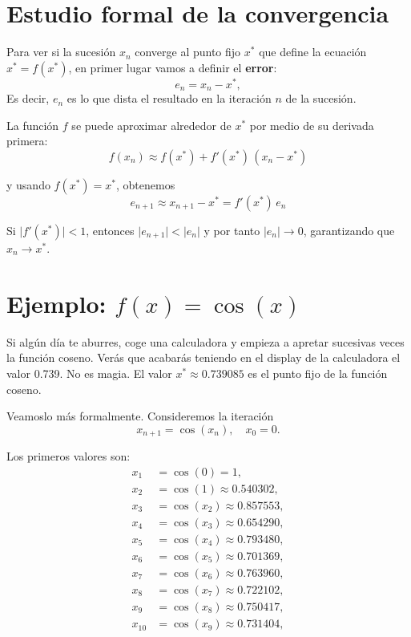 \documentclass[
  11pt,
  a4paper,
  DIV=11,
  numbers=noendperiod]{scrreprt}
\begin{document}
\section{Estudio formal de la
convergencia}\label{estudio-formal-de-la-convergencia}

Para ver si la sucesión \(x_n\) converge al punto fijo \(x^*\) que
define la ecuación \(x^* = f(x^*)\), en primer lugar vamos a definir el
\textbf{error}: \[
e_n = x_n - x^*,
\] Es decir, \(e_n\) es lo que dista el resultado en la iteración \(n\)
de la sucesión.

La función \(f\) se puede aproximar alrededor de \(x^*\) por medio de su
derivada primera: \[
f(x_n) \approx f(x^*) + f'(x^*)\,(x_n - x^*) 
\]

y usando \(f(x^*)=x^*\), obtenemos \[
e_{n+1} \approx x_{n+1} - x^* = f'(x^*)\,e_n 
\]

Si \(\lvert f'(x^*)\rvert < 1\), entonces
\(\lvert e_{n+1}\rvert < \lvert e_n\rvert\) y por tanto
\(\lvert e_n\rvert\to0\), garantizando que \(x_n\to x^*\).

\section{\texorpdfstring{Ejemplo:
\(f(x)=\cos(x)\)}{Ejemplo: f(x)=\textbackslash cos(x)}}\label{ejemplo-fxcosx}

Si algún día te aburres, coge una calculadora y empieza a apretar
sucesivas veces la función coseno. Verás que acabarás teniendo en el
display de la calculadora el valor 0.739. No es magia. El valor
\(x^* \approx 0.739085\) es el punto fijo de la función coseno.

Veamoslo más formalmente. Consideremos la iteración \[
x_{n+1} = \cos(x_n), \quad x_0 = 0.
\]

Los primeros valores son: \[
\begin{aligned}
x_1 &= \cos(0)=1,\\
x_2 &= \cos(1)\approx0.540302,\\
x_3 &= \cos(x_2)\approx0.857553,\\
x_4 &= \cos(x_3)\approx0.654290,\\
x_5 &= \cos(x_4)\approx0.793480,\\
x_6 &= \cos(x_5)\approx0.701369,\\
x_7 &= \cos(x_6)\approx0.763960,\\
x_8 &= \cos(x_7)\approx0.722102,\\
x_9 &= \cos(x_8)\approx0.750417,\\
x_{10} &= \cos(x_9)\approx0.731404,\\
\end{aligned}
\]
\end{document}
